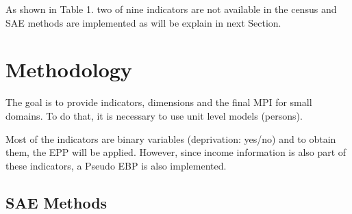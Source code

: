\documentclass[a4paper, 11pt]{article}
\begin{document}


As shown in Table 1. two of nine indicators are not available in the census and SAE methods are implemented as will be explain in next Section. 

\section{Methodology}



    The goal is to provide indicators, dimensions and the final MPI for small domains. To do that, it is necessary to use unit level models (persons).
    
    Most of the indicators are binary variables (deprivation: yes/no) and to obtain them, the EPP will be applied. However, since income information is also part of these indicators, a Pseudo EBP is also implemented. 
    
\subsection{SAE Methods}
\end{document}
